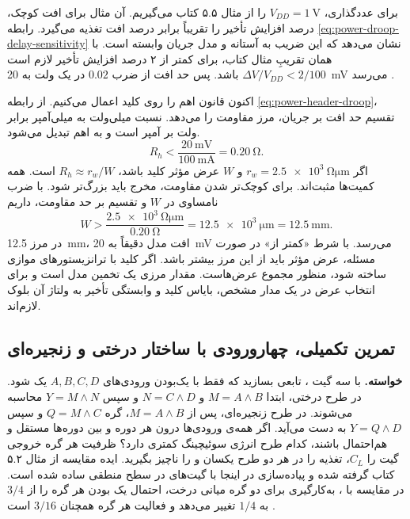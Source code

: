 برای عددگذاری، \(V_{DD}=\qty{1}{\volt}\) را از مثال ۵.۵ کتاب
می‌گیریم. آن مثال برای افت کوچک، درصد افزایش تأخیر را تقریباً
برابر درصد افت تغذیه می‌گیرد. رابطه
\eqref{eq:power-droop-delay-sensitivity} نشان می‌دهد که این ضریب
به آستانه و مدل جریان وابسته است. با همان تقریبِ مثال کتاب، برای
کمتر از ۲ درصد افزایش تأخیر لازم است
\(\Delta V/V_{DD}<2/100\) باشد. پس حد افت از ضرب \(0.02\) در
یک ولت به \qty{20}{\milli\volt} می‌رسد
\cite[مثال ۵.۵، صفحات ۱۹۸ و ۱۹۹]{weste}.

اکنون قانون اهم را روی کلید اعمال می‌کنیم. از رابطه
\eqref{eq:power-header-droop}، تقسیم حد افت بر جریان، مرز مقاومت
را می‌دهد. نسبت میلی‌ولت به میلی‌آمپر برابر ولت بر آمپر است و به
اهم تبدیل می‌شود.
\[
  R_h < \frac{\qty{20}{\milli\volt}}{\qty{100}{\milli\ampere}}
       =\qty{0.20}{\ohm}.
\]
اگر \(r_w=\qty{2.5e3}{\ohm\micro\metre}\) و \(W\) عرض مؤثر
کلید باشد، \(R_h\approx r_w/W\) است. همه کمیت‌ها مثبت‌اند. برای
کوچک‌تر شدن مقاومت، مخرج باید بزرگ‌تر شود. با ضرب نامساوی در
\(W\) و تقسیم بر حد مقاومت، داریم
\[
  W>\frac{\qty{2.5e3}{\ohm\micro\metre}}{\qty{0.20}{\ohm}}
    =\qty{12.5e3}{\micro\metre}=\qty{12.5}{\milli\metre}.
\]
در مرز \qty{12.5}{\milli\metre}، افت مدل دقیقاً به
\qty{20}{\milli\volt} می‌رسد. با شرط «کمتر از» در صورت مسئله،
عرض مؤثر باید از این مرز بیشتر باشد. اگر کلید با
ترانزیستورهای موازی ساخته شود، منظور مجموع عرض‌هاست. مقدار مرزی
یک تخمین مدل است و برای انتخاب عرض در یک مدار مشخص، بایاس کلید و
وابستگی تأخیر به ولتاژ آن بلوک لازم‌اند.

\subsection{تمرین تکمیلی،  چهارورودی با ساختار درختی و زنجیره‌ای}
\label{sec:power-exercise-and-topology}

\textbf{خواسته.}
با سه گیت ، تابعی بسازید که فقط با یک‌بودن ورودی‌های
\(A,B,C,D\) یک شود. در طرح درختی، ابتدا \(M=A\land B\) و
\(N=C\land D\) و سپس \(Y=M\land N\) محاسبه می‌شوند. در طرح
زنجیره‌ای، پس از \(M=A\land B\)، گره \(Q=M\land C\) و سپس
\(Y=Q\land D\) به دست می‌آید. اگر همه‌ی ورودی‌ها درون هر دوره و
بین دوره‌ها مستقل و هم‌احتمال باشند، کدام طرح انرژی سوئیچینگ
کمتری دارد؟ ظرفیت هر گره خروجی گیت را \(C_L\)، تغذیه را در هر
دو طرح یکسان و  را ناچیز بگیرید. ایده مقایسه از مثال
۵.۲ کتاب گرفته شده و پیاده‌سازی در اینجا با گیت‌های 
در سطح منطقی ساده شده است. در مقایسه با
، به‌کارگیری
 برای دو گره میانی درخت، احتمال یک بودن هر گره را
از \(3/4\) به \(1/4\) تغییر می‌دهد و فعالیت هر گره همچنان
\(3/16\) است \cite[صفحات ۱۸۷ و ۱۸۸]{weste}.

